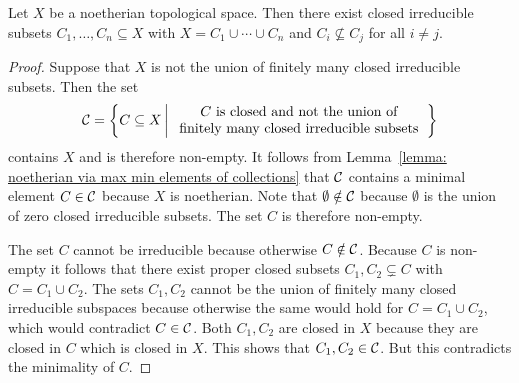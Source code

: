 \begin{proposition}
  \label{proposition: irreducible components of noetherian space alternative construction}
  Let $X$ be a noetherian topological space.
  Then there exist closed irreducible subsets $C_1, \dotsc, C_n \subseteq X$ with $X = C_1 \cup \dotsb \cup C_n$ and $C_i \nsubseteq C_j$ for all $i \neq j$.%
\end{proposition}


\begin{proof}
  Suppose that $X$ is not the union of finitely many closed irreducible subsets.
  Then the set
  \[
      \mc{C}
    = \left\{
        C \subseteq X
      \suchthat*
        \begin{tabular}{c}
          $C$ is closed and not the union of \\
          finitely many closed irreducible subsets
        \end{tabular}
      \right\}
  \]
  contains $X$ and is therefore non-empty.
  It follows from Lemma~\ref{lemma: noetherian via max min elements of collections} that $\mathcal{C}$ contains a minimal element $C \in \mathcal{C}$ because $X$ is noetherian.
  Note that $\emptyset \notin \mathcal{C}$ because $\emptyset$ is the union of zero closed irreducible subsets.
  The set $C$ is therefore non-empty.
  
  The set $C$ cannot be irreducible because otherwise $C \notin \mathcal{C}$.
  Because $C$ is non-empty it follows that there exist proper closed subsets $C_1, C_2 \subsetneq C$ with $C = C_1 \cup C_2$.
  The sets $C_1, C_2$ cannot be the union of finitely many closed irreducible subspaces because otherwise the same would hold for $C = C_1 \cup C_2$, which would contradict $C \in \mathcal{C}$.
  Both $C_1, C_2$ are closed in $X$ because they are closed in $C$ which is closed in $X$.
  This shows that $C_1, C_2 \in \mathcal{C}$.
  But this contradicts the minimality of $C$.
  

\end{proof}
